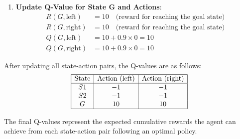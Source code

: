 \documentclass{article}
\begin{document}
\begin{enumerate}
    \item \textbf{Update Q-Value for State G and Actions}:
   \begin{align*}
   R(G, \text{left}) &= 10 \quad \text{(reward for reaching the goal state)} \\
   R(G, \text{right}) &= 10 \quad \text{(reward for reaching the goal state)} \\
   Q(G, \text{left}) &= 10 + 0.9 \times 0 = 10 \\
   Q(G, \text{right}) &= 10 + 0.9 \times 0 = 10
   \end{align*}
\end{enumerate}

After updating all state-action pairs, the Q-values are as follows:
   \[
   \begin{array}{|c|c|c|}
   \hline
   \text{State} & \text{Action (left)} & \text{Action (right)} \\
   \hline
   S1 & -1 & -1 \\
   S2 & -1 & -1 \\
   G & 10 & 10 \\
   \hline
   \end{array}
   \]

The final Q-values represent the expected cumulative rewards the agent can achieve from each state-action pair following an optimal policy.
\end{document}
